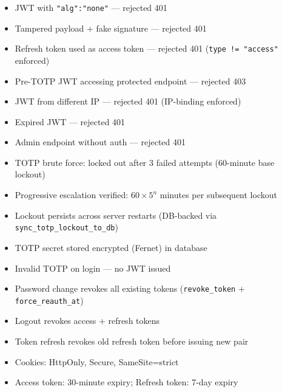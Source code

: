 \documentclass[11pt,a4paper]{article}
\begin{document}
\begin{tcolorbox}[colback=pass!5, colframe=pass, title=\textbf{JWT Security --- PASS}]
\begin{itemize}[nosep]
  \item JWT with \texttt{"alg":"none"} --- rejected 401
  \item Tampered payload + fake signature --- rejected 401
  \item Refresh token used as access token --- rejected 401 (\texttt{type != "access"} enforced)
  \item Pre-TOTP JWT accessing protected endpoint --- rejected 403
  \item JWT from different IP --- rejected 401 (IP-binding enforced)
  \item Expired JWT --- rejected 401
  \item Admin endpoint without auth --- rejected 401
\end{itemize}
\end{tcolorbox}

\begin{tcolorbox}[colback=pass!5, colframe=pass, title=\textbf{TOTP 2FA --- PASS}]
\begin{itemize}[nosep]
  \item TOTP brute force: locked out after 3 failed attempts (60-minute base lockout)
  \item Progressive escalation verified: $60 \times 5^n$ minutes per subsequent lockout
  \item Lockout persists across server restarts (DB-backed via \texttt{sync\_totp\_lockout\_to\_db})
  \item TOTP secret stored encrypted (Fernet) in database
  \item Invalid TOTP on login --- no JWT issued
\end{itemize}
\end{tcolorbox}

\begin{tcolorbox}[colback=pass!5, colframe=pass, title=\textbf{Session Management --- PASS}]
\begin{itemize}[nosep]
  \item Password change revokes all existing tokens (\texttt{revoke\_token} + \texttt{force\_reauth\_at})
  \item Logout revokes access + refresh tokens
  \item Token refresh revokes old refresh token before issuing new pair
  \item Cookies: HttpOnly, Secure, SameSite=strict
  \item Access token: 30-minute expiry; Refresh token: 7-day expiry
\end{itemize}
\end{tcolorbox}
\end{document}
